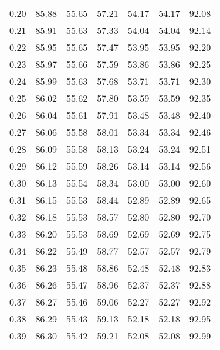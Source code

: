 \begin{tabular}{|c|c|c|c|c|c|c|}
      0.20 &     85.88 &     55.65 &      57.21 &   54.17 &      54.17 &         92.08 \\
      0.21 &     85.91 &     55.63 &      57.33 &   54.04 &      54.04 &         92.14 \\
      0.22 &     85.95 &     55.65 &      57.47 &   53.95 &      53.95 &         92.20 \\
      0.23 &     85.97 &     55.66 &      57.59 &   53.86 &      53.86 &         92.25 \\
      0.24 &     85.99 &     55.63 &      57.68 &   53.71 &      53.71 &         92.30 \\
      0.25 &     86.02 &     55.62 &      57.80 &   53.59 &      53.59 &         92.35 \\
      0.26 &     86.04 &     55.61 &      57.91 &   53.48 &      53.48 &         92.40 \\
      0.27 &     86.06 &     55.58 &      58.01 &   53.34 &      53.34 &         92.46 \\
      0.28 &     86.09 &     55.58 &      58.13 &   53.24 &      53.24 &         92.51 \\
      0.29 &     86.12 &     55.59 &      58.26 &   53.14 &      53.14 &         92.56 \\
      0.30 &     86.13 &     55.54 &      58.34 &   53.00 &      53.00 &         92.60 \\
      0.31 &     86.15 &     55.53 &      58.44 &   52.89 &      52.89 &         92.65 \\
      0.32 &     86.18 &     55.53 &      58.57 &   52.80 &      52.80 &         92.70 \\
      0.33 &     86.20 &     55.53 &      58.69 &   52.69 &      52.69 &         92.75 \\
      0.34 &     86.22 &     55.49 &      58.77 &   52.57 &      52.57 &         92.79 \\
      0.35 &     86.23 &     55.48 &      58.86 &   52.48 &      52.48 &         92.83 \\
      0.36 &     86.26 &     55.47 &      58.96 &   52.37 &      52.37 &         92.88 \\
      0.37 &     86.27 &     55.46 &      59.06 &   52.27 &      52.27 &         92.92 \\
      0.38 &     86.29 &     55.43 &      59.13 &   52.18 &      52.18 &         92.95 \\
      0.39 &     86.30 &     55.42 &      59.21 &   52.08 &      52.08 &         92.99 \\

\end{tabular}
